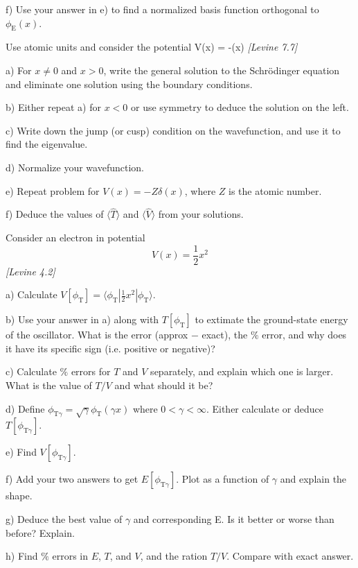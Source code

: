 f) Use your answer in e) to find a normalized basis function
orthogonal to $\phi_{\text{E}}(x)$.

\newpage


Use atomic units and consider the potential
\be
   V(x) = -\delta(x)
\ee
{\em [Levine 7.7]}

a) For $x\neq 0$ and $x > 0$, write the general solution to the Schr{\"o}dinger equation
and eliminate one solution using the  boundary conditions.

b) Either repeat a) for $x<0$ or use symmetry to deduce the solution on the left.

c) Write down the jump (or cusp) condition on the wavefunction, and use it to find the
eigenvalue.

d) Normalize your wavefunction.

e) Repeat problem for $V(x) = -Z\delta(x)$, where $Z$ is the atomic number.

f) Deduce the values of $\langle \hat{T} \rangle$ and $\langle \hat{V} \rangle$ from your
solutions.

\newpage
{}
Consider an electron in potential $$V(x) = \frac{1}{2}x^2$$
{\em [Levine 4.2]}

a) Calculate $V[\phi_{\text{T}}] = \langle\phi_{\text{T}}|\frac{1}{2}x^2|\phi_{\text{T}}\rangle$.

b) Use your answer in a) along with $T[\phi_{\text{T}}]$ to extimate the ground-state
energy of the oscillator. What is the error (approx $-$ exact), the $\%$ error, and
why does it have its specific sign (i.e. positive or negative)?

c) Calculate $\%$ errors for $T$ and $V$ separately, and explain which one is
larger. What is the value of $T/V$ and what should it be?

d) Define $\phi_{\text{T}\gamma} = \sqrt{\gamma}\phi_{\text{T}}(\gamma x)$ where
$0 < \gamma < \infty$. Either calculate or deduce $T[\phi_{\text{T}\gamma}]$.

e) Find $V[\phi_{\text{T}\gamma}]$.

f) Add your two answers to get $E[\phi_{\text{T}\gamma}]$. Plot as a
function of $\gamma$ and explain the shape.

g) Deduce the best value of $\gamma$ and corresponding E. Is
it better or worse than before? Explain.

h) Find $\%$ errors in $E$, $T$, and $V$, and the ration $T/V$. Compare
with exact answer.

